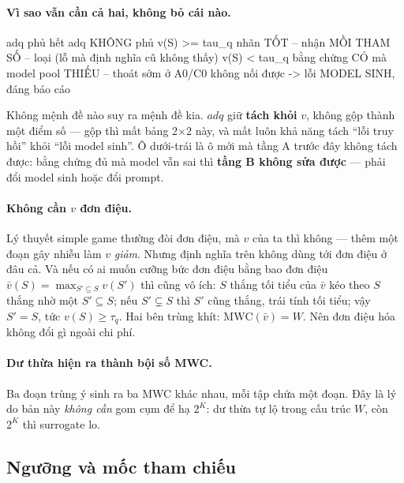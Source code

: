 \documentclass[11pt,a4paper]{article}
\begin{document}
\paragraph{Vì sao vẫn cần cả hai, không bỏ cái nào.}

\begin{dia}
                     adq phủ hết                    adq KHÔNG phủ
v(S) >= tau_q   nhãn TỐT -- nhận              MỒI THAM SỐ -- loại
                                              (lỗ mà định nghĩa cũ không thấy)
v(S) <  tau_q   bằng chứng CÓ mà model        pool THIẾU -- thoát sớm ở A0/C0
                không nối được
                -> lỗi MODEL SINH, đáng báo cáo
\end{dia}

Không mệnh đề nào suy ra mệnh đề kia. $adq$ giữ \textbf{tách khỏi} $v$, không gộp thành một
điểm số --- gộp thì mất bảng 2$\times$2 này, và mất luôn khả năng tách ``lỗi truy hồi'' khỏi
``lỗi model sinh''. Ô dưới-trái là ô mới mà tầng A trước đây không tách được: bằng chứng đủ mà
model vẫn sai thì \textbf{tầng B không sửa được} --- phải đổi model sinh hoặc đổi prompt.

\paragraph{Không cần $v$ đơn điệu.} Lý thuyết simple game thường đòi đơn điệu, mà $v$ của ta
thì không --- thêm một đoạn gây nhiễu làm $v$ \emph{giảm}. Nhưng định nghĩa trên không dùng
tới đơn điệu ở đâu cả. Và nếu có ai muốn cưỡng bức đơn điệu bằng bao đơn điệu
$\bar v(S)=\max_{S'\subseteq S}v(S')$ thì cũng vô ích: $S$ thắng tối tiểu của $\bar v$ kéo
theo $S$ thắng nhờ một $S'\subseteq S$; nếu $S'\subsetneq S$ thì $S'$ cũng thắng, trái tính
tối tiểu; vậy $S'=S$, tức $v(S)\ge\tau_q$. Hai bên trùng khít: $\mathrm{MWC}(\bar v)=W$. Nên
đơn điệu hóa không đổi gì ngoài chi phí.

\paragraph{Dư thừa hiện ra thành bội số MWC.} Ba đoạn trùng ý sinh ra ba MWC khác nhau, mỗi
tập chứa một đoạn. Đây là lý do bản này \emph{không cần} gom cụm để hạ $2^K$: dư thừa tự lộ
trong cấu trúc $W$, còn $2^K$ thì surrogate lo.

\subsection{Ngưỡng và mốc tham chiếu}
\end{document}
